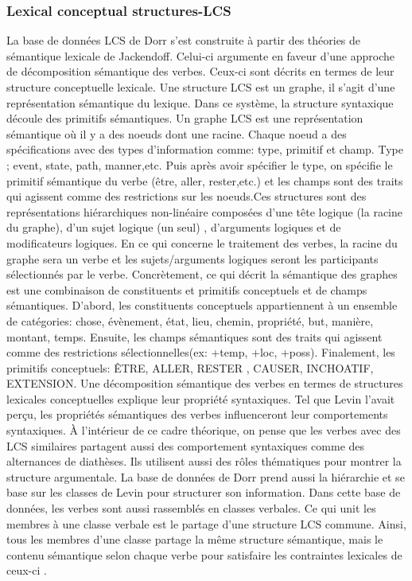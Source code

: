 
\subsubsection{Lexical conceptual structures-LCS}
La base de données LCS de Dorr s'est construite à partir des théories de sémantique lexicale de Jackendoff. Celui-ci argumente en faveur d'une approche de décomposition sémantique des verbes. Ceux-ci sont décrits en termes de leur structure conceptuelle lexicale\citep{DorrUseLexicalSemantics1992}. Une structure LCS est un graphe, il s'agit d'une représentation sémantique du lexique. Dans ce système, la structure syntaxique découle des primitifs sémantiques. Un graphe LCS est une représentation sémantique où il y a des noeuds dont une racine. Chaque noeud a des spécifications avec des types d'information comme: type, primitif et champ. Type ; event, state, path, manner,etc. Puis après avoir spécifier le type, on spécifie le primitif sémantique du verbe (être, aller, rester,etc.)  et les champs sont des traits qui agissent comme des restrictions sur les noeuds.Ces structures sont des représentations hiérarchiques non-linéaire composées d'une tête logique (la racine du graphe), d'un sujet logique (un seul) , d'arguments logiques et de modificateurs logiques. En ce qui concerne le traitement des verbes, la racine du graphe sera un verbe et les sujets/arguments logiques seront les participants sélectionnés par le verbe. Concrètement, ce qui décrit la sémantique des graphes est une combinaison de constituents et primitifs conceptuels et de champs sémantiques. D'abord, les constituents conceptuels appartiennent à un ensemble de catégories: chose, évènement, état, lieu, chemin, propriété, but, manière, montant, temps. Ensuite, les champs sémantiques sont des traits qui agissent comme des restrictions sélectionnelles(ex: +temp, +loc, +poss). Finalement, les primitifs conceptuels: ÊTRE, ALLER, RESTER , CAUSER, INCHOATIF, EXTENSION. Une décomposition sémantique des verbes en termes de structures lexicales conceptuelles explique leur propriété syntaxiques. Tel que Levin l'avait perçu, les propriétés sémantiques des verbes influenceront leur comportements syntaxiques. À l'intérieur de ce cadre théorique, on pense que les verbes avec des LCS similaires partagent aussi des comportement syntaxiques comme des alternances de diathèses. Ils utilisent aussi des rôles thématiques pour montrer la structure argumentale. La base de données de Dorr prend aussi la hiérarchie et se base sur les classes de Levin pour structurer son information. Dans cette base de données, les verbes sont aussi rassemblés en classes verbales. Ce qui unit les membres à une classe verbale est le partage d'une structure LCS commune. Ainsi, tous les membres d'une classe partage la même structure sémantique, mais le contenu sémantique selon chaque verbe pour satisfaire les contraintes lexicales de ceux-ci \citep{TraumGenerationLexicalConceptual2000}. 

